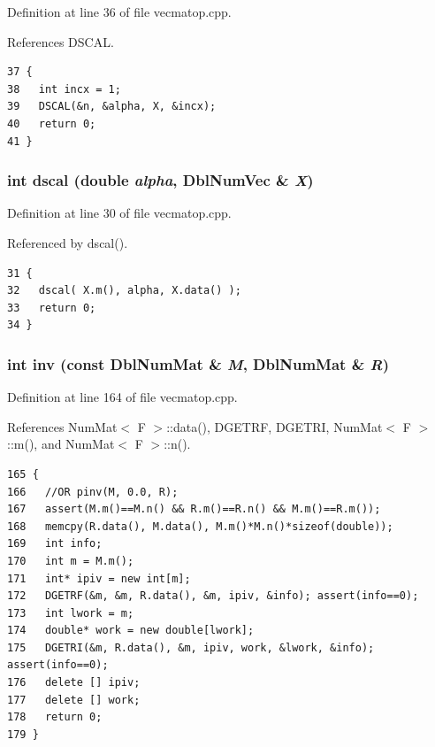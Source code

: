 Definition at line 36 of file vecmatop.cpp.

References DSCAL.

\footnotesize\begin{verbatim}37 {
38   int incx = 1;
39   DSCAL(&n, &alpha, X, &incx);
40   return 0;
41 }
\end{verbatim}\normalsize 


\subsubsection{\setlength{\rightskip}{0pt plus 5cm}int dscal (double {\em alpha}, {\bf Dbl\-Num\-Vec} \& {\em X})}\label{vecmatop_8cpp_3b4887d360a4d7483a4a1060d10012f7_3b4887d360a4d7483a4a1060d10012f7}




Definition at line 30 of file vecmatop.cpp.

Referenced by dscal().

\footnotesize\begin{verbatim}31 {
32   dscal( X.m(), alpha, X.data() );
33   return 0;
34 }
\end{verbatim}\normalsize 


\subsubsection{\setlength{\rightskip}{0pt plus 5cm}int inv (const {\bf Dbl\-Num\-Mat} \& {\em M}, {\bf Dbl\-Num\-Mat} \& {\em R})}\label{vecmatop_8cpp_9b79730e9b5f630d287f00e551e8c344_9b79730e9b5f630d287f00e551e8c344}




Definition at line 164 of file vecmatop.cpp.

References Num\-Mat$<$ F $>$::data(), DGETRF, DGETRI, Num\-Mat$<$ F $>$::m(), and Num\-Mat$<$ F $>$::n().

\footnotesize\begin{verbatim}165 {
166   //OR pinv(M, 0.0, R);
167   assert(M.m()==M.n() && R.m()==R.n() && M.m()==R.m());
168   memcpy(R.data(), M.data(), M.m()*M.n()*sizeof(double));
169   int info;
170   int m = M.m();
171   int* ipiv = new int[m];
172   DGETRF(&m, &m, R.data(), &m, ipiv, &info); assert(info==0);
173   int lwork = m;
174   double* work = new double[lwork];
175   DGETRI(&m, R.data(), &m, ipiv, work, &lwork, &info);  assert(info==0);
176   delete [] ipiv;
177   delete [] work;
178   return 0;
179 }
\end{verbatim}\normalsize 


